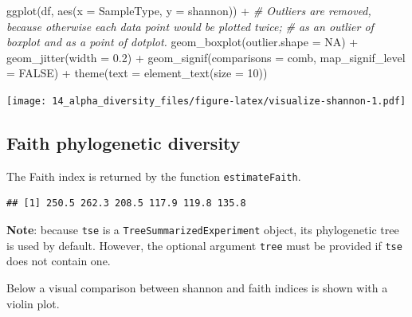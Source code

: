 \documentclass[
]{book}
\newenvironment{Shaded}{\begin{snugshade}}{\end{snugshade}}
\newcommand{\AttributeTok}[1]{\textcolor[rgb]{0.77,0.63,0.00}{#1}}
\newcommand{\CommentTok}[1]{\textcolor[rgb]{0.56,0.35,0.01}{\textit{#1}}}
\newcommand{\ConstantTok}[1]{\textcolor[rgb]{0.00,0.00,0.00}{#1}}
\newcommand{\DecValTok}[1]{\textcolor[rgb]{0.00,0.00,0.81}{#1}}
\newcommand{\FloatTok}[1]{\textcolor[rgb]{0.00,0.00,0.81}{#1}}
\newcommand{\FunctionTok}[1]{\textcolor[rgb]{0.00,0.00,0.00}{#1}}
\newcommand{\NormalTok}[1]{#1}
\newcommand{\OtherTok}[1]{\textcolor[rgb]{0.56,0.35,0.01}{#1}}
\newcommand{\SpecialCharTok}[1]{\textcolor[rgb]{0.00,0.00,0.00}{#1}}
\newcommand{\StringTok}[1]{\textcolor[rgb]{0.31,0.60,0.02}{#1}}
\begin{document}
\begin{Shaded}
\begin{Highlighting}[]
\FunctionTok{ggplot}\NormalTok{(df, }\FunctionTok{aes}\NormalTok{(}\AttributeTok{x =}\NormalTok{ SampleType, }\AttributeTok{y =}\NormalTok{ shannon)) }\SpecialCharTok{+}
  \CommentTok{\# Outliers are removed, because otherwise each data point would be plotted twice; }
  \CommentTok{\# as an outlier of boxplot and as a point of dotplot.}
  \FunctionTok{geom\_boxplot}\NormalTok{(}\AttributeTok{outlier.shape =} \ConstantTok{NA}\NormalTok{) }\SpecialCharTok{+} 
  \FunctionTok{geom\_jitter}\NormalTok{(}\AttributeTok{width =} \FloatTok{0.2}\NormalTok{) }\SpecialCharTok{+} 
  \FunctionTok{geom\_signif}\NormalTok{(}\AttributeTok{comparisons =}\NormalTok{ comb, }\AttributeTok{map\_signif\_level =} \ConstantTok{FALSE}\NormalTok{) }\SpecialCharTok{+}
  \FunctionTok{theme}\NormalTok{(}\AttributeTok{text =} \FunctionTok{element\_text}\NormalTok{(}\AttributeTok{size =} \DecValTok{10}\NormalTok{))}
\end{Highlighting}
\end{Shaded}

\texttt{[image: 14\_alpha\_diversity\_files/figure-latex/visualize-shannon-1.pdf]}

\hypertarget{faith-diversity}{%
\subsection{Faith phylogenetic diversity}\label{faith-diversity}}

The Faith index is returned by the function \texttt{estimateFaith}.

\begin{Shaded}
\end{Shaded}

\begin{verbatim}
## [1] 250.5 262.3 208.5 117.9 119.8 135.8
\end{verbatim}

\textbf{Note}: because \texttt{tse} is a \texttt{TreeSummarizedExperiment} object, its phylogenetic tree is used by default. However, the optional argument \texttt{tree} must be provided if \texttt{tse} does not contain one.

Below a visual comparison between shannon and faith indices is shown with a violin plot.
\end{document}
